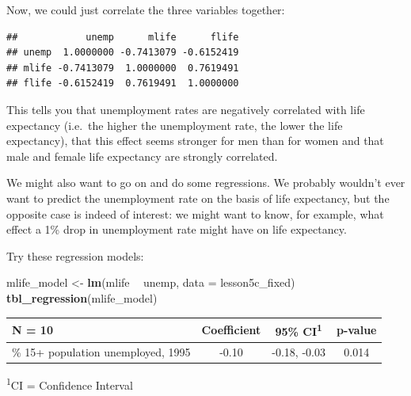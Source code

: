 \documentclass[]{book}
\newenvironment{Shaded}{\begin{snugshade}}{\end{snugshade}}
\newcommand{\CommentTok}[1]{\textcolor[rgb]{0.56,0.35,0.01}{\textit{#1}}}
\newcommand{\DataTypeTok}[1]{\textcolor[rgb]{0.13,0.29,0.53}{#1}}
\newcommand{\KeywordTok}[1]{\textcolor[rgb]{0.13,0.29,0.53}{\textbf{#1}}}
\newcommand{\NormalTok}[1]{#1}
\newcommand{\OperatorTok}[1]{\textcolor[rgb]{0.81,0.36,0.00}{\textbf{#1}}}
\newcommand{\StringTok}[1]{\textcolor[rgb]{0.31,0.60,0.02}{#1}}
\begin{document}
Now, we could just correlate the three variables together:

\begin{Shaded}
\end{Shaded}

\begin{verbatim}
##            unemp      mlife      flife
## unemp  1.0000000 -0.7413079 -0.6152419
## mlife -0.7413079  1.0000000  0.7619491
## flife -0.6152419  0.7619491  1.0000000
\end{verbatim}

This tells you that unemployment rates are negatively correlated with
life expectancy (i.e.~the higher the unemployment rate, the lower the
life expectancy), that this effect seems stronger for men than for women
and that male and female life expectancy are strongly correlated.

We might also want to go on and do some regressions. We probably
wouldn't ever want to predict the unemployment rate on the basis of life
expectancy, but the opposite case is indeed of interest: we might want
to know, for example, what effect a 1\% drop in unemployment rate might
have on life expectancy.

Try these regression models:

\begin{Shaded}
\begin{Highlighting}[]
\NormalTok{mlife_model <-}\StringTok{ }\KeywordTok{lm}\NormalTok{(mlife }\OperatorTok{~}\StringTok{ }\NormalTok{unemp, }\DataTypeTok{data =}\NormalTok{ lesson5c_fixed)}
\KeywordTok{tbl_regression}\NormalTok{(mlife_model)}
\end{Highlighting}
\end{Shaded}

\captionsetup[table]{labelformat=empty,skip=1pt}
\begin{longtable}{lccc}
\toprule
\textbf{N = 10} & \textbf{Coefficient} & \textbf{95\% CI}\textsuperscript{1} & \textbf{p-value} \\ 
\midrule
\% 15+ population unemployed, 1995 & -0.10 & -0.18, -0.03 & 0.014 \\ 
\bottomrule
\end{longtable}
\vspace{-5mm}
\begin{minipage}{\linewidth}
\textsuperscript{1}CI = Confidence Interval \\ 
\end{minipage}
\end{document}
